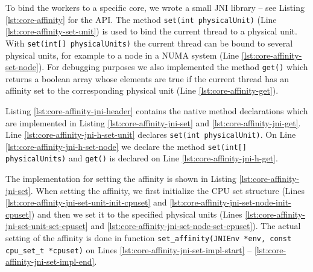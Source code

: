 To bind the workers to a specific core, we wrote a small JNI library
-- see Listing \ref{lst:core-affinity} for the API. The method
\lstinline!set(int physicalUnit)!  (Line
\ref{lst:core-affinity-set-unit}) is used to bind the current thread
to a physical unit. With \lstinline!set(int[] physicalUnits)! the
current thread can be bound to several physical units, for example to
a node in a NUMA system (Line \ref{lst:core-affinity-set-node}). For
debugging purposes we also implemented the method \lstinline!get()!
which returns a boolean array whose elements are true if the current
thread has an affinity set to the corresponding physical unit (Line
\ref{lst:core-affinity-get}).



Listing \ref{lst:core-affinity-jni-header} contains the native method
declarations which are implemented in Listing
\ref{lst:core-affinity-jni-set} and
\ref{lst:core-affinity-jni-get}. Line
\ref{lst:core-affinity-jni-h-set-unit} declares
\lstinline!set(int physicalUnit)!. On Line
\ref{lst:core-affinity-jni-h-set-node} we declare the method
\lstinline!set(int[] physicalUnits)! and \lstinline!get()! is declared
on Line \ref{lst:core-affinity-jni-h-get}.





The implementation for setting the affinity is shown in Listing
\ref{lst:core-affinity-jni-set}. When setting the affinity, we first
initialize the CPU set structure (Lines
\ref{lst:core-affinity-jni-set-unit-init-cpuset} and
\ref{lst:core-affinity-jni-set-node-init-cpuset}) and then we set it
to the specified physical units (Lines
\ref{lst:core-affinity-jni-set-unit-set-cpuset} and
\ref{lst:core-affinity-jni-set-node-set-cpuset}). The actual setting of
the affinity is done in function
\lstinline!set_affinity(JNIEnv *env, const cpu_set_t *cpuset)! on Lines
\ref{lst:core-affinity-jni-set-impl-start} --
\ref{lst:core-affinity-jni-set-impl-end}.

